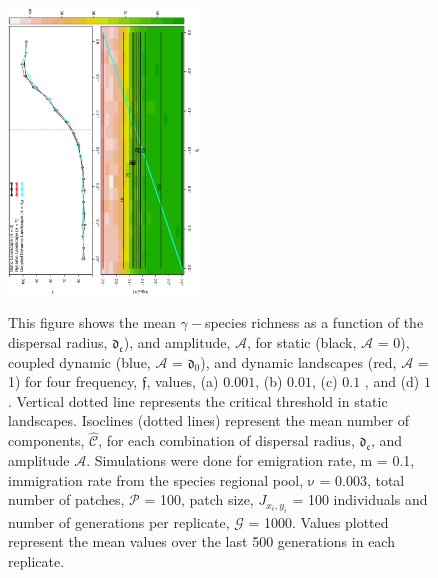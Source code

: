 \documentclass[12pt]{article}
\begin{document}
\begin{figure}[hb!]
\begin{center}
\includegraphics[width=2in,angle=-90]{./figures/Figure_7_1.eps}\\
\end{center}
\caption{This figure shows the mean $\gamma-$species richness as a function of the dispersal radius, $\mathfrak{d_{c}}$), and amplitude, $\mathcal{A}$, for static (black, $\mathcal{A}$ = 0), coupled dynamic (blue, $\mathcal{A}$ = $\mathfrak{d_{0}}$), and dynamic landscapes (red, $\mathcal{A}$ = 1) for four frequency, $\mathfrak{f}$, values, (a) $0.001$, (b) $0.01$, (c) $0.1$ , and (d) $1$. Vertical dotted line represents the critical threshold in static landscapes. Isoclines (dotted lines) represent the mean number of components, $\hat{\mathcal{C}}$, for each combination of dispersal radius, $\mathfrak{d_{c}}$, and amplitude $\mathcal{A}$. Simulations were done for emigration rate, $\mathrm{m}$ = 0.1, immigration rate from the species regional pool, $\mathrm{\nu}$ = 0.003, total number of patches, $\mathcal{P}$ = 100, patch size, $J_{x_i,y_i}$ = 100 individuals and number of generations per replicate, $\mathcal{G}$ = 1000. Values plotted represent the mean values over the last 500 generations in each replicate.}
\label{fig:SI-E1}
\end{figure}
\end{document}
